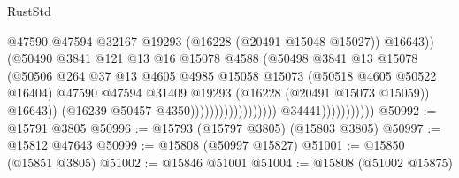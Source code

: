 \begin{lexlean}{RustStd}
\begin{coremodule}
                                                              @47590
                                                              @47594
                                                              @32167
                                                              @19293
                                                              (@16228 (@20491 @15048 @15027))
                                                              @16643))
                                                          (@50490
                                                            @3841
                                                            @121
                                                            @13
                                                            @16
                                                            @15078
                                                            @4588
                                                            (@50498
                                                              @3841
                                                              @13
                                                              @15078
                                                              (@50506
                                                                @264
                                                                @37
                                                                @13
                                                                @4605
                                                                @4985
                                                                @15058
                                                                @15073
                                                                (@50518 @4605 @50522 @16404)
                                                                @47590
                                                                @47594
                                                                @31409
                                                                @19293
                                                                (@16228 (@20491 @15073 @15059))
                                                                @16643))
                                                            (@16239 @50457 @4350))))))))))))))))))
                          @34441)))))))))))
@50992 := @15791 @3805
@50996 := @15793 (@15797 @3805) (@15803 @3805)
@50997 := @15812 @47643
@50999 := @15808 (@50997 @15827)
@51001 := @15850 (@15851 @3805)
@51002 := @15846 @51001
@51004 := @15808 (@51002 @15875)

\end{coremodule}
\end{lexlean}
